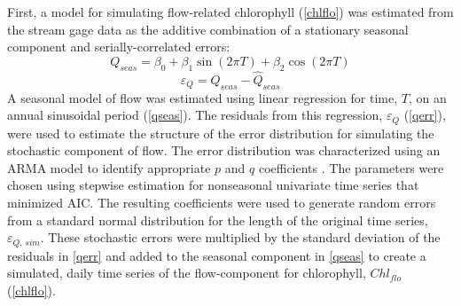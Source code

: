 \documentclass[letterpaper,12pt,oneside]{article}\usepackage[]{graphicx}\usepackage[]{color}
\begin{document}
First, a model for simulating flow-related chlorophyll (\cref{chlflo}) was estimated from the stream gage data as the additive combination of a stationary seasonal component and serially-correlated errors:
\begin{equation} \label{qseas}
Q_{seas} = \beta_0 + \beta_1 \sin\left(2\pi T\right) + \beta_2 \cos\left(2\pi T\right)
\end{equation}
\begin{equation} \label{qerr}
\varepsilon_{Q} = Q_{seas} - \hat{Q}_{seas}
\end{equation}
A seasonal model of flow was estimated using linear regression for time, $T$, on an annual sinusoidal period (\cref{qseas}).  The residuals from this regression, $\varepsilon_{Q}$ (\cref{qerr}), were used to estimate the structure of the error distribution for simulating the stochastic component of flow.  The error distribution was characterized using an \ac{ARMA} model to identify appropriate $p$ and $q$ coefficients \citep{Hyndman08}.  The parameters were chosen using stepwise estimation for nonseasonal univariate time series that minimized \ac{AIC}.  The resulting coefficients were used to generate random errors from a standard normal distribution for the length of the original time series, $\varepsilon_{Q,\,sim}$.  These stochastic errors were multiplied by the standard deviation of the residuals in \cref{qerr} and added to the seasonal component in \cref{qseas} to create a simulated, daily time series of the flow-component for chlorophyll, $Chl_{flo}$ (\cref{chlflo}).
\end{document}
